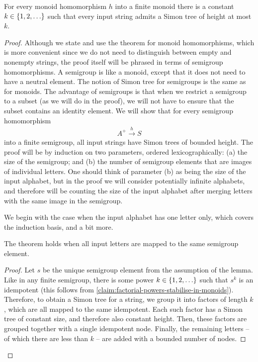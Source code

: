 \begin{theorem}\label{thm:factorisation-forest}
    For every monoid homomorphism $h$ into  a finite monoid 
    there is a constant $k \in \{1,2,\ldots\}$ such that every input string admits a Simon tree of height at most $k$.  
\end{theorem}
\begin{proof}
    Although we state and  use the theorem for monoid homomorphisms, which is more convenient since we do not need to distinguish between empty and nonempty strings, the proof itself will be phrased in terms of   semigroup homomorphisms. A semigroup is  like a monoid,  except that it  does not need to have a neutral element. The notion of Simon tree for semigroups is the same as for monoids. The advantage of semigroups is that when we restrict a semigroup to a subset (as we will do in the proof), we will not have to ensure that the subset contains an identity element.  We will show that for every semigroup homomorphism 
\begin{align*}
A^+ \xrightarrow h S
\end{align*}
into a finite semigroup, all input strings have Simon trees of bounded height. The proof will be by induction on two parameters, ordered lexicographically: (a) the size of the semigroup; and (b) the number of semigroup elements that are images of individual letters.
One should think of parameter (b) as being the size of the input alphabet, but in the proof we will consider potentially infinite alphabets, and therefore will be counting the size of the input alphabet after merging letters with the same image in the semigroup.

We begin with the case when the input alphabet has one letter only, which covers the induction basis, and a bit more. 

\begin{lemma}\label{lem:factorisation-forest-single-letter}
    The theorem holds when all input letters are mapped to the same semigroup element.
\end{lemma}
\begin{proof}
    Let $s$ be the unique semigroup element from the assumption of the lemma. Like in any finite semigroup, there is some power $k \in \{1,2,\ldots\}$ such that $s^k$ is an idempotent (this follows from \cref{claim:factorial-powers-stabilise-in-monoids}). Therefore, to obtain a Simon tree for a string, we group it into factors of length $k$, which are all mapped to the same idempotent. Each such factor has a Simon tree of constant size, and therefore also constant height. Then, these factors are grouped together with a single idempotent node. Finally, the remaining letters -- of which there are less than $k$ -- are added with a bounded number of nodes. 
\end{proof}


\end{proof}
